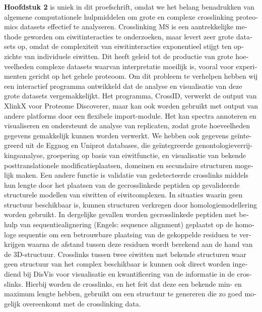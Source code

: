\begin{otherlanguage}{dutch}
  \textbf{Hoofdstuk 2} is uniek in dit proefschrift, omdat we het belang benadrukken van algemene computationele hulpmiddelen om grote en complexe crosslinking proteomics datasets effectief te analyseren. Crosslinking MS is een aantrekkelijke methode geworden om eiwitinteracties te onderzoeken, maar levert zeer grote datasets op, omdat de complexiteit van eiwitinteracties exponentieel stijgt ten opzichte van individuele eiwitten. Dit heeft geleid tot de productie van grote hoeveelheden complexe datasets waarvan interpretatie moeilijk is, vooral voor experimenten gericht op het gehele proteoom. Om dit probleem te verhelpen hebben wij een interactief programma ontwikkeld dat de analyse en visualisatie van deze grote datasets vergemakkelijkt. Het programma, CrossID, verwerkt de output van XlinkX voor Proteome Discoverer, maar kan ook worden gebruikt met output van andere platforms door een flexibele import-module. Het kan spectra annoteren en visualiseren en ondersteunt de analyse van replicaten, zodat grote hoeveelheden gegevens gemakkelijk kunnen worden verwerkt. We hebben ook gegevens geïntegreerd uit de Eggnog en Uniprot databases, die geïntegreerde genontologieverrijkingsanalyse, groepering op basis van eiwitfunctie, en visualisatie van bekende posttranslationele modificatieplaatsen, domeinen en secundaire structuren mogelijk maken. Een andere functie is validatie van gedetecteerde crosslinks middels hun lengte door het plaatsen van de gecrosslinkede peptiden op gevalideerde structurele modellen van eiwitten of eiwitcomplexen. In situaties waarin geen structuur beschikbaar is, kunnen structuren verkregen door homologiemodellering worden gebruikt. In dergelijke gevallen worden gecrosslinkede peptiden met behulp van sequentiealignering (Engels: sequence alignment) geplaatst op de homologe sequentie om een betrouwbare plaatsing van de gekoppelde residuen te verkrijgen waarna de afstand tussen deze residuen wordt berekend aan de hand van de 3D-structuur. Crosslinks tussen twee eiwitten met bekende structuren waar geen structuur van het complex beschikbaar is kunnen ook direct worden ingediend bij DisVis voor visualisatie en kwantificering van de informatie in de crosslinks. Hierbij worden de crosslinks, en het feit dat deze een bekende min- en maximum lengte hebben, gebruikt om een structuur te genereren die zo goed mogelijk overeenkomt met de crosslinking data.
  \bigskip\\

\end{otherlanguage}
